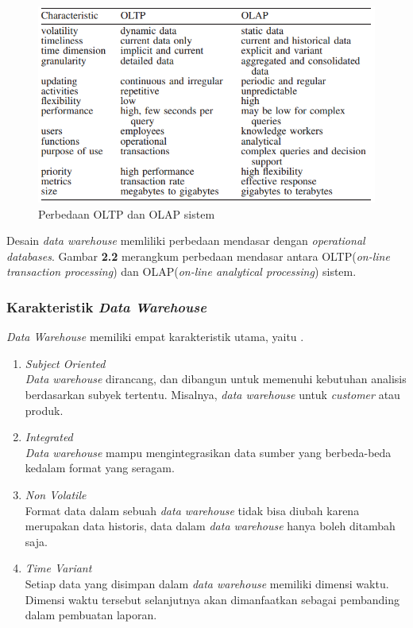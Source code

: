 \begin{figure}[h]
	\centering
	\includegraphics[scale=0.65]{Gambar/OLTP&OLAP}
	\caption{Perbedaan OLTP dan OLAP sistem \cite{Carlo:2009}}
	\end{figure}
	
	Desain \textit{data warehouse} memliliki perbedaan mendasar dengan \textit{operational databases}. Gambar \textbf{2.2} merangkum perbedaan mendasar antara OLTP(\textit{on-line transaction processing}) dan OLAP(\textit{on-line analytical processing}) sistem. 
	
\subsubsection{Karakteristik \textit{Data Warehouse}}
\textit{Data Warehouse} memiliki empat karakteristik utama, yaitu \cite{Matteo:2009}.
\begin{enumerate}
	\item \textit{Subject Oriented}\\
	\textit{Data warehouse} dirancang, dan dibangun untuk memenuhi kebutuhan analisis berdasarkan subyek tertentu. Misalnya, \textit{data warehouse} untuk \textit{customer} atau produk.
	\item \textit{Integrated}\\
	\textit{Data warehouse} mampu mengintegrasikan data sumber yang berbeda-beda kedalam format yang seragam.
	\item \textit{Non Volatile}\\
	Format data dalam sebuah \textit{data warehouse} tidak bisa diubah karena merupakan data historis, data dalam \textit{data warehouse} hanya boleh ditambah saja.
	\item \textit{Time Variant}\\
	Setiap data yang disimpan dalam \textit{data warehouse} memiliki dimensi waktu. Dimensi waktu tersebut selanjutnya akan dimanfaatkan sebagai pembanding dalam pembuatan laporan.
\end{enumerate}
	
